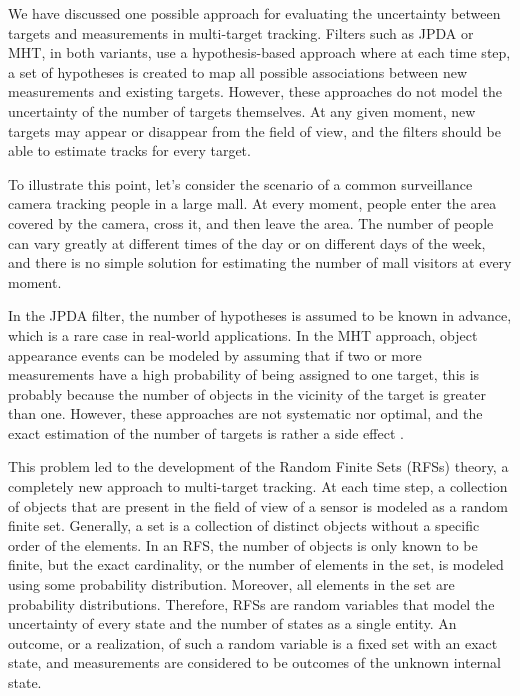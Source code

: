We have discussed one possible approach for evaluating the uncertainty between targets and measurements in multi-target tracking. Filters such as JPDA or MHT, in both variants, use a hypothesis-based approach where at each time step, a set of hypotheses is created to map all possible associations between new measurements and existing targets. However, these approaches do not model the uncertainty of the number of targets themselves. At any given moment, new targets may appear or disappear from the field of view, and the filters should be able to estimate tracks for every target.

To illustrate this point, let's consider the scenario of a common surveillance camera tracking people in a large mall. At every moment, people enter the area covered by the camera, cross it, and then leave the area. The number of people can vary greatly at different times of the day or on different days of the week, and there is no simple solution for estimating the number of mall visitors at every moment.

In the JPDA filter, the number of hypotheses is assumed to be known in advance, which is a rare case in real-world applications. In the MHT approach, object appearance events can be modeled by assuming that if two or more measurements have a high probability of being assigned to one target, this is probably because the number of objects in the vicinity of the target is greater than one. However, these approaches are not systematic nor optimal, and the exact estimation of the number of targets is rather a side effect \cite{challaFundamentalsObjectTracking2011}.

This problem led to the development of the Random Finite Sets (RFSs) theory, a completely new approach to multi-target tracking. At each time step, a collection of objects that are present in the field of view of a sensor is modeled as a random finite set. Generally, a set is a collection of distinct objects without a specific order of the elements. In an RFS, the number of objects is only known to be finite, but the exact cardinality, or the number of elements in the set, is modeled using some probability distribution. Moreover, all elements in the set are probability distributions. Therefore, RFSs are random variables that model the uncertainty of every state and the number of states as a single entity. An outcome, or a realization, of such a random variable is a fixed set with an exact state, and measurements are considered to be outcomes of the unknown internal state.

